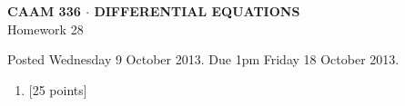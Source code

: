 \documentclass[10pt]{article}
\begin{document}
\vspace*{-5em}
\begin{center}
\large \textsf{\textbf{CAAM 336 $\cdot$ DIFFERENTIAL EQUATIONS}\\[0.5em]
Homework 28 }
\end{center}

Posted Wednesday 9 October 2013.  Due 1pm Friday 18 October 2013.

\begin{enumerate}\addtocounter{enumi}{27}
\item {[25 points]}  
\end{enumerate}
\end{document}
